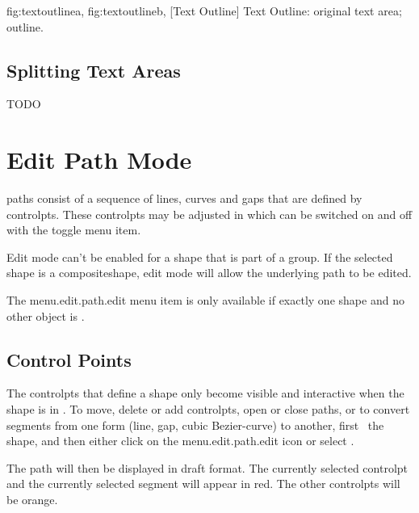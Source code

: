 {
 {fig:textoutlinea}{}{},
 {fig:textoutlineb}{}{},
}
[Text Outline]
{Text Outline:  original text area;
   outline.}


\section{Splitting Text Areas}\label{sec:splittext}


TODO

\chapter{Edit Path Mode}\label{sec:editpath}


\Glspl{path} consist of a sequence of lines, curves and \glspl{gap} 
that are defined by \glspl{controlpt}. These \glspl{controlpt} may be adjusted in
\emph{} which can be switched on and off
with the  toggle menu item.

\begin{information}
Edit mode can't be enabled for a \gls{shape} that is part of a \gls{group}.
If the selected shape is a \gls{compositeshape}, edit mode will allow the
underlying path to be edited.
\end{information}

The \gls{menu.edit.path.edit} menu item
is only available if exactly one \gls{shape} and no other
\gls{object} is \selected.

\section{Control Points}\label{sec:editcontrolpt}

The \glspl{controlpt} that define a \gls{shape} only become visible
and interactive when the shape is in \editpathmode.
To move, delete or add \glspl{controlpt}, open or close
\glspl{path}, or to convert segments from one form (line, \gls{gap}, cubic
\gls{Bezier-curve}) to another, first \select\ the \gls*{shape}, and
then either click on the \gls{menu.edit.path.edit} icon or select
.

The \gls*{path} will then be displayed in draft format.  The
currently selected \gls*{controlpt} and the currently selected
segment will appear in red. The other \glspl*{controlpt} will be
orange.

